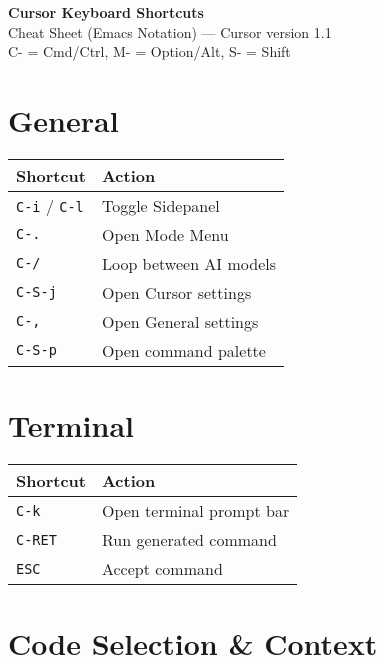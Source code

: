 \documentclass[10pt,landscape]{article}
\newcommand{\key}[1]{\textcolor{keycolor}{\texttt{#1}}}
\begin{document}
\begin{center}
{\huge\textbf{Cursor Keyboard Shortcuts}}\\
{\large Cheat Sheet (Emacs Notation) --- Cursor version 1.1}\\
\vspace{0.5em}
{\small C- = Cmd/Ctrl, M- = Option/Alt, S- = Shift}
\end{center}

\vspace{0.5em}

\begin{multicols}{2}

\section*{\textcolor{sectioncolor}{General}}

\begin{tabular}{@{}p{3cm}p{6.5cm}@{}}
\toprule
\textbf{Shortcut} & \textbf{Action} \\
\midrule
\key{C-i} / \key{C-l} & Toggle Sidepanel \\
\key{C-.} & Open Mode Menu \\
\key{C-/} & Loop between AI models \\
\key{C-S-j} & Open Cursor settings \\
\key{C-,} & Open General settings \\
\key{C-S-p} & Open command palette \\
\bottomrule
\end{tabular}

\section*{\textcolor{sectioncolor}{Terminal}}

\begin{tabular}{@{}p{3cm}p{6.5cm}@{}}
\toprule
\textbf{Shortcut} & \textbf{Action} \\
\midrule
\key{C-k} & Open terminal prompt bar \\
\key{C-RET} & Run generated command \\
\key{ESC} & Accept command \\
\bottomrule
\end{tabular}

\section*{\textcolor{sectioncolor}{Code Selection \& Context}}


\end{multicols}
\end{document}
